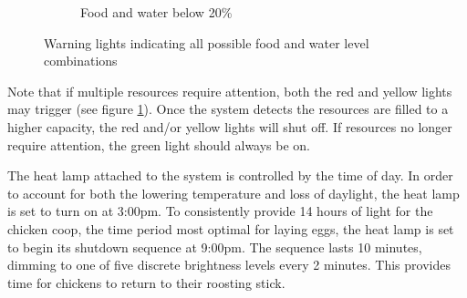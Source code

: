 \documentclass{article}
\begin{document}
\begin{figure}[H]
\begin{subfigure}[b]{0.45\textwidth}
        \caption[]%
        {Food and water below 20\%}
        \label{fig:red-yellow}
    \end{subfigure} 
    \caption{Warning lights indicating all possible food and water level combinations} 
    \label{fig:warning-lights}
\end{figure}


Note that if multiple resources require attention, both the red and yellow lights may trigger (see figure \ref{fig:red-yellow}). Once the system detects the resources are filled to a higher capacity, the red and/or yellow lights will shut off. If resources no longer require attention, the green light should always be on.

The heat lamp attached to the system is controlled by the time of day. In order to account for both the lowering temperature and loss of daylight, the heat lamp is set to turn on at 3:00pm. To consistently provide 14 hours of light for the chicken coop, the time period most optimal for laying eggs, the heat lamp is set to begin its shutdown sequence at 9:00pm. The sequence lasts 10 minutes, dimming to one of five discrete brightness levels every 2 minutes. This provides time for chickens to return to their roosting stick.
\end{document}
